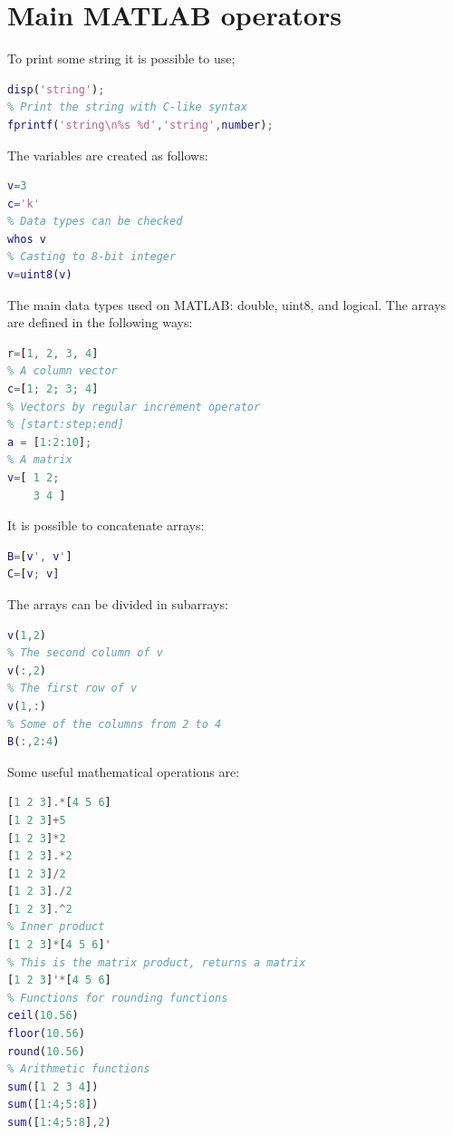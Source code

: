 \documentclass[12pt, a4paper]{report}
\begin{document}
    \section{Main MATLAB operators}
    To print some string it is possible to use; 
    \begin{lstlisting}[language=Matlab]
% Print the string
disp('string');
% Print the string with C-like syntax
fprintf('string\n%s %d','string',number);
    \end{lstlisting}
    The variables are created as follows: 
    \begin{lstlisting}[language=Matlab]
% Variables are created by assignements
v=3
c='k'
% Data types can be checked
whos v
% Casting to 8-bit integer
v=uint8(v)
    \end{lstlisting}
    The main data types used on MATLAB: double, uint8, and logical. The arrays are defined in the following ways: 
    \begin{lstlisting}[language=Matlab]
% A row vector
r=[1, 2, 3, 4]
% A column vector
c=[1; 2; 3; 4]
% Vectors by regular increment operator
% [start:step:end]
a = [1:2:10];
% A matrix
v=[ 1 2; 
    3 4 ]
    \end{lstlisting}
    It is possible to concatenate arrays: 
    \begin{lstlisting}[language=Matlab]
B=[v', v']
C=[v; v]        
    \end{lstlisting}
    The arrays can be divided in subarrays: 
    \begin{lstlisting}[language=Matlab]
% First row and second column 
v(1,2) 
% The second column of v
v(:,2)
% The first row of v
v(1,:) 
% Some of the columns from 2 to 4
B(:,2:4) 
    \end{lstlisting}
    Some useful mathematical operations are: 
    \begin{lstlisting}[language=Matlab]
% . means elementwise operation
[1 2 3].*[4 5 6]
[1 2 3]+5
[1 2 3]*2 
[1 2 3].*2 
[1 2 3]/2
[1 2 3]./2 
[1 2 3].^2 
% Inner product
[1 2 3]*[4 5 6]' 
% This is the matrix product, returns a matrix
[1 2 3]'*[4 5 6] 
% Functions for rounding functions
ceil(10.56)
floor(10.56)
round(10.56)
% Arithmetic functions
sum([1 2 3 4])
sum([1:4;5:8])
sum([1:4;5:8],2)
    \end{lstlisting}
\end{document}
